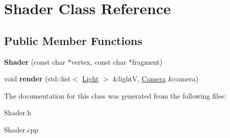 \hypertarget{class_shader}{}\section{Shader Class Reference}
\label{class_shader}
\subsection*{Public Member Functions}
\begin{DoxyCompactItemize}
\item 
\mbox{\label{class_shader_a7e02f1eaec796a7fc02c3191ce9fa5d4}} 
{\bfseries Shader} (const char $\ast$vertex, const char $\ast$fragment)
\item 
\mbox{\label{class_shader_a4bb445563c154a27e3dc0e1036690841}} 
void {\bfseries render} (std\+::list$<$ \hyperlink{class_light}{Light} $>$ \&lightV, \hyperlink{class_camera}{Camera} \&camera)
\end{DoxyCompactItemize}


The documentation for this class was generated from the following files\+:\begin{DoxyCompactItemize}
\item 
Shader.\+h\item 
Shader.\+cpp\end{DoxyCompactItemize}
